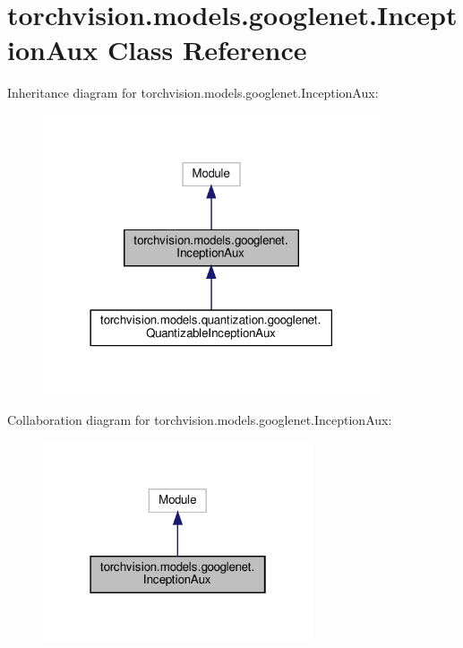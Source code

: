 \hypertarget{classtorchvision_1_1models_1_1googlenet_1_1InceptionAux}{}\section{torchvision.\+models.\+googlenet.\+Inception\+Aux Class Reference}
\label{classtorchvision_1_1models_1_1googlenet_1_1InceptionAux}


Inheritance diagram for torchvision.\+models.\+googlenet.\+Inception\+Aux\+:
\nopagebreak
\begin{figure}[H]
\begin{center}
\leavevmode
\includegraphics[width=282pt]{classtorchvision_1_1models_1_1googlenet_1_1InceptionAux__inherit__graph}
\end{center}
\end{figure}


Collaboration diagram for torchvision.\+models.\+googlenet.\+Inception\+Aux\+:
\nopagebreak
\begin{figure}[H]
\begin{center}
\leavevmode
\includegraphics[width=226pt]{classtorchvision_1_1models_1_1googlenet_1_1InceptionAux__coll__graph}
\end{center}
\end{figure}
